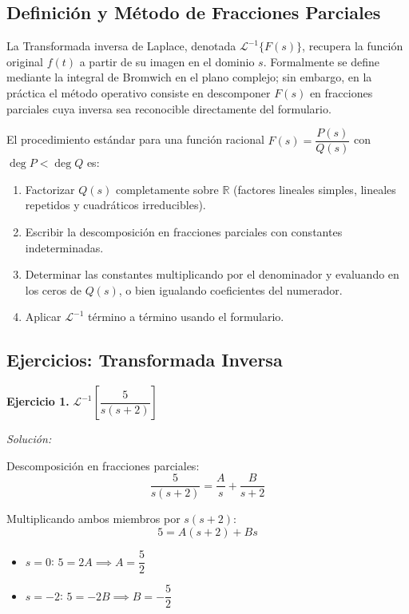 \documentclass[12pt,letterpaper]{report}
\numberwithin{equation}{chapter}
\numberwithin{figure}{chapter}
\numberwithin{table}{chapter}
\begin{document}
\subsection{Definición y Método de Fracciones Parciales}

La Transformada inversa de Laplace, denotada $\mathcal{L}^{-1}\{F(s)\}$, recupera la función original $f(t)$ a partir de su imagen en el dominio $s$. Formalmente se define mediante la integral de Bromwich en el plano complejo; sin embargo, en la práctica el método operativo consiste en descomponer $F(s)$ en fracciones parciales cuya inversa sea reconocible directamente del formulario.

El procedimiento estándar para una función racional $F(s) = \dfrac{P(s)}{Q(s)}$ con $\deg P < \deg Q$ es:

\begin{enumerate}
    \item Factorizar $Q(s)$ completamente sobre $\mathbb{R}$ (factores lineales simples, lineales repetidos y cuadráticos irreducibles).
    \item Escribir la descomposición en fracciones parciales con constantes indeterminadas.
    \item Determinar las constantes multiplicando por el denominador y evaluando en los ceros de $Q(s)$, o bien igualando coeficientes del numerador.
    \item Aplicar $\mathcal{L}^{-1}$ término a término usando el formulario.
\end{enumerate}

\subsection{Ejercicios: Transformada Inversa}

\textbf{Ejercicio 1.} $\mathcal{L}^{-1}\!\left[\dfrac{5}{s(s + 2)}\right]$

\textit{Solución:}

Descomposición en fracciones parciales:
\[
\dfrac{5}{s(s + 2)} = \dfrac{A}{s} + \dfrac{B}{s + 2}
\]

Multiplicando ambos miembros por $s(s+2)$:
\[
5 = A(s + 2) + Bs
\]

\begin{itemize}
    \item $s = 0$: $5 = 2A \implies A = \dfrac{5}{2}$
    \item $s = -2$: $5 = -2B \implies B = -\dfrac{5}{2}$
\end{itemize}
\end{document}

